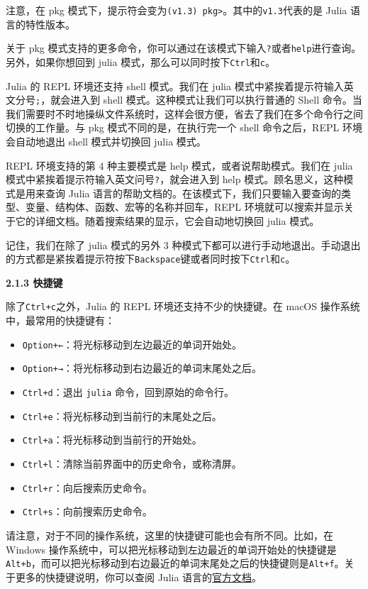 注意，在 pkg 模式下，提示符会变为\verb|(v1.3) pkg>|。其中的\verb|v1.3|代表的是 Julia 语言的特性版本。

关于 pkg 模式支持的更多命令，你可以通过在该模式下输入\verb|?|或者\verb|help|进行查询。另外，如果你想回到 julia 模式，那么可以同时按下\verb|Ctrl|和\verb|c|。

Julia 的 REPL 环境还支持 shell 模式。我们在 julia 模式中紧挨着提示符输入英文分号\verb|;|，就会进入到 shell 模式。这种模式让我们可以执行普通的 Shell 命令。当我们需要时不时地操纵文件系统时，这样会很方便，省去了我们在多个命令行之间切换的工作量。与 pkg 模式不同的是，在执行完一个 shell 命令之后，REPL 环境会自动地退出 shell 模式并切换回 julia 模式。

REPL 环境支持的第 4 种主要模式是 help 模式，或者说帮助模式。我们在 julia 模式中紧挨着提示符输入英文问号\verb|?|，就会进入到 help 模式。顾名思义，这种模式是用来查询 Julia 语言的帮助文档的。在该模式下，我们只要输入要查询的类型、变量、结构体、函数、宏等的名称并回车，REPL 环境就可以搜索并显示关于它的详细文档。随着搜索结果的显示，它会自动地切换回 julia 模式。

记住，我们在除了 julia 模式的另外 3 种模式下都可以进行手动地退出。手动退出的方式都是紧挨着提示符按下\verb|Backspace|键或者同时按下\verb|Ctrl|和\verb|c|。

\textbf{2.1.3 快捷键}

除了\verb|Ctrl+c|之外，Julia 的 REPL 环境还支持不少的快捷键。在 macOS 操作系统中，最常用的快捷键有：

\begin{itemize}
\item \verb|Option+←|：将光标移动到左边最近的单词开始处。
\item  \verb|Option+→|：将光标移动到右边最近的单词末尾处之后。
\item  \verb|Ctrl+d|：退出 \verb|julia| 命令，回到原始的命令行。
\item  \verb|Ctrl+e|：将光标移动到当前行的末尾处之后。
\item  \verb|Ctrl+a|：将光标移动到当前行的开始处。
\item  \verb|Ctrl+l|：清除当前界面中的历史命令，或称清屏。
\item  \verb|Ctrl+r|：向后搜索历史命令。
\item  \verb|Ctrl+s|：向前搜索历史命令。
\end{itemize}

请注意，对于不同的操作系统，这里的快捷键可能也会有所不同。比如，在 Windows 操作系统中，可以把光标移动到左边最近的单词开始处的快捷键是\verb|Alt+b|，而可以把光标移动到右边最近的单词末尾处之后的快捷键则是\verb|Alt+f|。关于更多的快捷键说明，你可以查阅 Julia 语言的\href{https://docs.julialang.org/en/v1/stdlib/REPL/#Key-bindings-1}{官方文档}。

